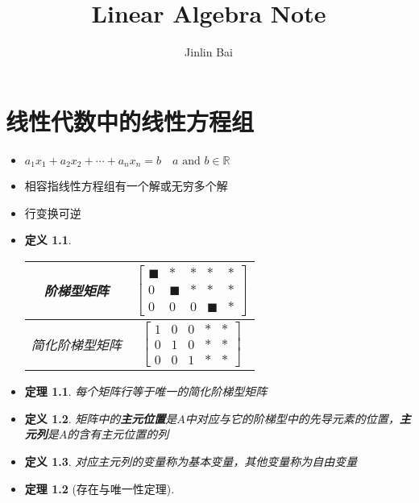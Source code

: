 \documentclass[UTF8]{report}
\author{Jinlin Bai}
\title{Linear Algebra Note}
\begin{document}
	\maketitle
	\tableofcontents
	\newpage
	\newtheorem{define}{定义}
	\newtheorem{theorem}{定理}
	\chapter{线性代数中的线性方程组}
	\begin{itemize}
		\item $a_1 x_1 + a_2 x_2 + \cdots + a_n x_n = b \quad a \textrm{ and } b\in \mathbb{R}$
		\item 相容指线性方程组有一个解或无穷多个解 
		\item 行变换可逆
		\item \begin{define}
			\begin{tabular}{|c|c|}
				\hline
				阶梯型矩阵 & $\begin{bmatrix}
					\blacksquare & * & * & * & * \\
					0 & \blacksquare & * & * & * \\
					0 & 0 & 0 & \blacksquare & *
				\end{bmatrix}$ \\
				\hline
				简化阶梯型矩阵 & $\begin{bmatrix}
					1 & 0 & 0 & * & * \\
					0 & 1 & 0 & * & * \\
					0 & 0 & 1 & * & *
				\end{bmatrix}$\\
				\hline
			\end{tabular}
		\end{define}
		\item \begin{theorem}
			每个矩阵行等于唯一的简化阶梯型矩阵
		\end{theorem}
		\item \begin{define}
			矩阵中的\textbf{主元位置}是$A$中对应与它的阶梯型中的先导元素的位置，\textbf{主元列}是$A$的含有\textit{主元位置}的列
		\end{define}
		\item \begin{define}
			对应主元列的变量称为基本变量，其他变量称为自由变量
			\end{define}
		\item \begin{theorem}[存在与唯一性定理]

\end{theorem}
\end{itemize}
\end{document}
